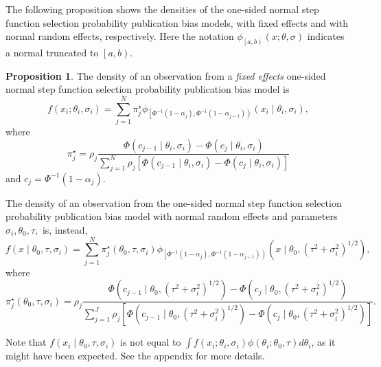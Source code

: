 \documentclass{article}
\theoremstyle{plain}
\theoremstyle{definition}
\newtheorem{prop}[theorem]{Proposition}
\renewcommand{\sqrt}[1]{(#1)^{1/2}}
\begin{document}
The following proposition shows the densities of the one-sided normal step function selection probability publication bias models, with fixed effects and with normal random effects, respectively. Here the notation $\phi_{\left[a,b\right)}\left(x;\theta,\sigma\right)$ indicates a normal truncated to $\left[a,b\right)$.
\begin{prop}
\label{prop:One-sided normal discrete probability vector publication bias model-1}
The density of an observation from a \emph{fixed effects} one-sided normal step function selection probability publication bias model is
\begin{equation}\label{eq:Fixed effects, publication bias}
f\left(x_{i};\theta_{i},\sigma_{i}\right) = \sum_{j=1}^{N}\pi_{j}^\star\phi_{\left[\Phi^{-1}\left(1-\alpha_{j}\right),\Phi^{-1}\left(1-\alpha_{j-1}\right)\right)}\left(x_{i}\mid\theta_{i},\sigma_{i}\right),
\end{equation}
where
$$
\pi_{j}^{\star}=\rho_{j}\frac{\Phi\left(c_{j-1}\mid\theta_{i},\sigma_{i}\right)-\Phi\left(c_{j}\mid\theta_{i},\sigma_{i}\right)}{\sum_{j=1}^{N}\rho_{j}\left[\Phi\left(c_{j-1}\mid\theta_{i},\sigma_{i}\right)-\Phi\left(c_{j}\mid\theta_{i},\sigma_{i}\right)\right]}
$$
and $c_{j}=\Phi^{-1}\left(1-\alpha_{j}\right)$.

The density of an observation from the one-sided normal step function selection probability publication bias model with normal random effects and parameters $\sigma_{i},\theta_{0},\tau,$ is, instead,
\begin{equation}\label{eq:Random effects, publication bias}
f\left(x\mid\theta_{0},\tau,\sigma_{i}\right)=\sum_{j=1}^{N}\pi_{j}^{\star}\left(\theta_0,\tau,\sigma_{i}\right)\phi_{\left[\Phi^{-1}\left(1-\alpha_{j}\right),\Phi^{-1}\left(1-\alpha_{j-1}\right)\right)}\left(x\mid\theta_{0},\sqrt{\tau^{2}+\sigma_{i}^{2}}\right),
\end{equation}
where 
\[
\pi_{j}^{\star}\left(\theta_0,\tau,\sigma_{i}\right)=\rho_{j}\frac{\Phi\left(c_{j-1}\mid\theta_{0},\sqrt{\tau^{2}+\sigma_{i}^{2}}\right)-\Phi\left(c_{j}\mid\theta_{0},\sqrt{\tau^{2}+\sigma_{i}^{2}}\right)}{\sum_{j=1}^{J}\rho_{j}\left[\Phi\left(c_{j-1}\mid\theta_{0},\sqrt{\tau^{2}+\sigma_{i}^{2}}\right)-\Phi\left(c_{j}\mid\theta_{0},\sqrt{\tau^{2}+\sigma_{i}^{2}}\right)\right]}.
\]
\end{prop}

Note that $f\left(x_i\mid\theta_{0},\tau,\sigma_i\right)$ is not equal to $\int f\left(x_{i};\theta_{i},\sigma_{i}\right)\phi\left(\theta_{i};\theta_{0},\tau\right)d\theta_{i}$,
as it might have been expected. See the appendix for more details.
\end{document}
